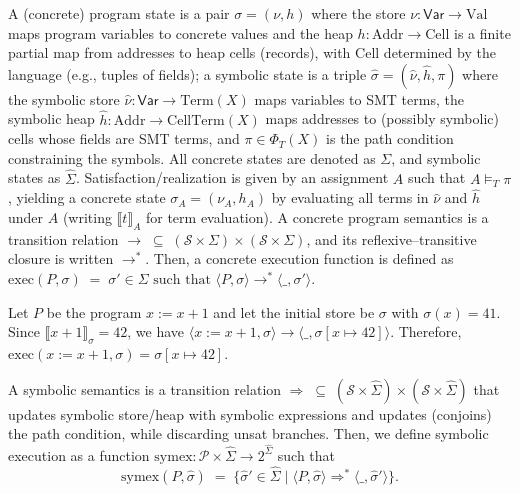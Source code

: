 \documentclass[acmsmall,screen,nonacm]{acmart}
\theoremstyle{definition}
\begin{document}
A (concrete) program state is a pair $\sigma=(\nu,h)$ where the store $\nu:\mathsf{Var}\to\mathrm{Val}$ maps program variables to concrete values and the heap $h:\mathrm{Addr}\rightarrow \mathrm{Cell}$ is a finite partial map from addresses to heap cells (records), with $\mathrm{Cell}$ determined by the language (e.g., tuples of fields); a symbolic state is a triple $\hat\sigma=(\hat\nu,\hat h,\pi)$ where the symbolic store $\hat\nu:\mathsf{Var}\to\mathrm{Term}(X)$ maps variables to SMT terms, the symbolic heap $\hat h:\mathrm{Addr}\rightarrow \mathrm{CellTerm}(X)$ maps addresses to (possibly symbolic) cells whose fields are SMT terms, and $\pi\in\Phi_{T}(X)$ is the path condition constraining the symbols. All concrete states are denoted as $\Sigma$, and symbolic states as $\widehat{\Sigma}$. Satisfaction/realization is given by an assignment $A$ such that $A\models_T \pi$, yielding a concrete state $\sigma_A=(\nu_A,h_A)$ by evaluating all terms in $\hat\nu$ and $\hat h$ under $A$ (writing $\llbracket t\rrbracket_A$ for term evaluation). A concrete program semantics is a transition relation $\to \;\subseteq\; (\mathcal S\times \Sigma)\times(\mathcal S\times \Sigma)$, and its reflexive–transitive closure is written $\to^{*}$. Then, a concrete execution function is defined as $\mathrm{exec}(P,\sigma)\;=\;\sigma' \in \Sigma \text{ such that } \langle P,\sigma\rangle \to^{*} \langle \_,\sigma'\rangle.$

\begin{example}
Let $P$ be the program $x := x + 1$ and let the initial store be
$\sigma$ with $\sigma(x)=41$. Since $\llbracket x+1\rrbracket_\sigma = 42$, we have $\langle x := x + 1,\sigma\rangle \to \langle \_, \sigma[x \mapsto 42]\rangle$. Therefore, $\mathrm{exec}(x := x+1,\sigma)=\sigma[x \mapsto 42]$.
\end{example}

A symbolic semantics is a transition relation $\Rightarrow \;\subseteq\; (\mathcal S\times \widehat\Sigma)\times(\mathcal S\times \widehat\Sigma)$ that updates symbolic store/heap with symbolic expressions and updates (conjoins) the path condition, while discarding unsat branches. Then, we define symbolic execution as a function $\mathrm{symex}:\mathcal P\times \widehat\Sigma \to 2^{\widehat\Sigma}$ such that
\[
\mathrm{symex}(P,\hat\sigma)\;=\;\{\hat\sigma' \in \widehat\Sigma \mid \langle P,\hat\sigma\rangle \Rightarrow^{*} \langle \_,\hat\sigma'\rangle\}.
\]
\end{document}
